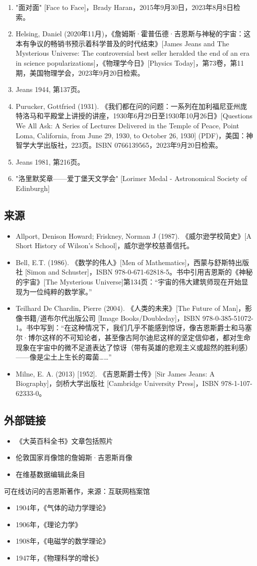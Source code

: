 \begin{enumerate}
\item "面对面" [Face to Face]，Brady Haran，2015年9月30日，2023年8月8日检索。  
\item Helsing, Daniel (2020年11月)，《詹姆斯·霍普伍德·吉恩斯与神秘的宇宙：这本有争议的畅销书预示着科学普及的时代结束》[James Jeans and The Mysterious Universe: The controversial best seller heralded the end of an era in science popularizations]，《物理学今日》[Physics Today]，第73卷，第11期，美国物理学会，2023年9月20日检索。  
\item Jeans 1944, 第137页。  
\item Purucker, Gottfried (1931). 《我们都在问的问题：一系列在加利福尼亚州庞特洛马和平殿堂上讲授的讲座，1930年6月29日至1930年10月26日》[Questions We All Ask: A Series of Lectures Delivered in the Temple of Peace, Point Loma, California, from June 29, 1930, to October 26, 1930] (PDF)，美国：神智学大学出版社，223页。ISBN 0766139565，2023年9月20日检索。  
\item Jeans 1981, 第216页。  
\item "洛里默奖章——爱丁堡天文学会" [Lorimer Medal - Astronomical Society of Edinburgh]
\end{enumerate}
\subsection{来源}  
\begin{itemize}
\item Allport, Denison Howard; Friskney, Norman J (1987). 《威尔逊学校简史》[A Short History of Wilson's School]，威尔逊学校慈善信托。  
\item Bell, E.T. (1986). 《数学的伟人》[Men of Mathematics]，西蒙与舒斯特出版社 [Simon and Schuster]，ISBN 978-0-671-62818-5。书中引用吉恩斯的《神秘的宇宙》[The Mysterious Universe]第134页：“宇宙的伟大建筑师现在开始显现为一位纯粹的数学家。”  
\item Teilhard De Chardin, Pierre (2004). 《人类的未来》[The Future of Man]，影像书籍/道布尔代出版公司 [Image Books/Doubleday]，ISBN 978-0-385-51072-1。书中写到：“在这种情况下，我们几乎不能感到惊讶，像吉恩斯爵士和马塞尔·博尔这样的不可知论者，甚至像古阿尔迪尼这样的坚定信仰者，都对生命现象在宇宙中的微不足道表达了惊讶（带有英雄的悲观主义或超然的胜利感）——像是尘土上生长的霉菌……”  
\item Milne, E. A. (2013) [1952]. 《吉恩斯爵士传》[Sir James Jeans: A Biography]，剑桥大学出版社 [Cambridge University Press]，ISBN 978-1-107-62333-0。
\end{itemize}
\subsection{外部链接} 
\begin{itemize}
\item 《大英百科全书》文章包括照片  
\item 伦敦国家肖像馆的詹姆斯·吉恩斯肖像  
\item 在维基数据编辑此条目 
\end{itemize} 
可在线访问的吉恩斯著作，来源：互联网档案馆  
\begin{itemize}
\item 1904年，《气体的动力学理论》  
\item 1906年，《理论力学》  
\item 1908年，《电磁学的数学理论》  
\item 1947年，《物理科学的增长》
\end{itemize}